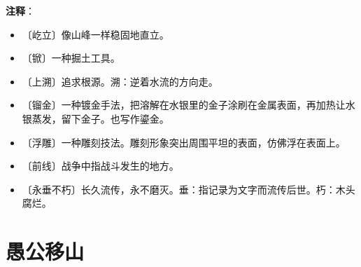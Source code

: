 \documentclass[12pt,UTF-8,openany]{ctexbook}
\begin{document}
\newpage

\textbf{注释}：

\vspace{-1em}

\begin{itemize}
    \setlength\itemsep{-0.2em}
    \item 〔屹立〕像山峰一样稳固地直立。
    \item 〔锨〕一种掘土工具。
    \item 〔上溯〕追求根源。溯：逆着水流的方向走。
    \item 〔镏金〕一种镀金手法，把溶解在水银里的金子涂刷在金属表面，再加热让水银蒸发，留下金子。也写作鎏金。
    \item 〔浮雕〕一种雕刻技法。雕刻形象突出周围平坦的表面，仿佛浮在表面上。
    \item 〔前线〕战争中指战斗发生的地方。
    \item 〔永垂不朽〕长久流传，永不磨灭。垂：指记录为文字而流传后世。朽：木头腐烂。
\end{itemize}

\chapter{愚公移山}
\end{document}
